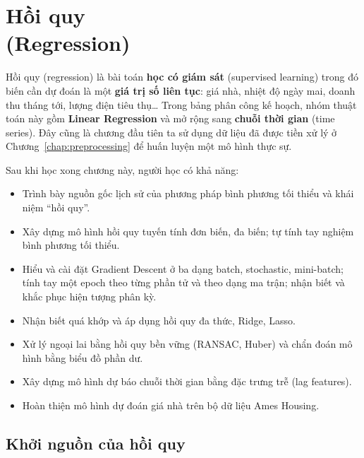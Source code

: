 
\chapter{Hồi quy \\ (Regression)}
\label{chap:regression}

Hồi quy (regression) là bài toán \textbf{học có giám sát} (supervised learning) trong đó biến cần dự đoán là một \textbf{giá trị số liên tục}: giá nhà, nhiệt độ ngày mai, doanh thu tháng tới, lượng điện tiêu thụ\ldots{} Trong bảng phân công kế hoạch, nhóm thuật toán này gồm \textbf{Linear Regression} và mở rộng sang \textbf{chuỗi thời gian} (time series). Đây cũng là chương đầu tiên ta sử dụng dữ liệu đã được tiền xử lý ở Chương~\ref{chap:preprocessing} để huấn luyện một mô hình thực sự.

\noindent Sau khi học xong chương này, người học có khả năng:
\begin{itemize}
    \item Trình bày nguồn gốc lịch sử của phương pháp bình phương tối thiểu và khái niệm ``hồi quy''.
    \item Xây dựng mô hình hồi quy tuyến tính đơn biến, đa biến; tự tính tay nghiệm bình phương tối thiểu.
    \item Hiểu và cài đặt Gradient Descent ở ba dạng batch, stochastic, mini-batch; tính tay một epoch theo từng phần tử và theo dạng ma trận; nhận biết và khắc phục hiện tượng phân kỳ.
    \item Nhận biết quá khớp và áp dụng hồi quy đa thức, Ridge, Lasso.
    \item Xử lý ngoại lai bằng hồi quy bền vững (RANSAC, Huber) và chẩn đoán mô hình bằng biểu đồ phần dư.
    \item Xây dựng mô hình dự báo chuỗi thời gian bằng đặc trưng trễ (lag features).
    \item Hoàn thiện mô hình dự đoán giá nhà trên bộ dữ liệu Ames Housing.
\end{itemize}

\section{Khởi nguồn của hồi quy}

